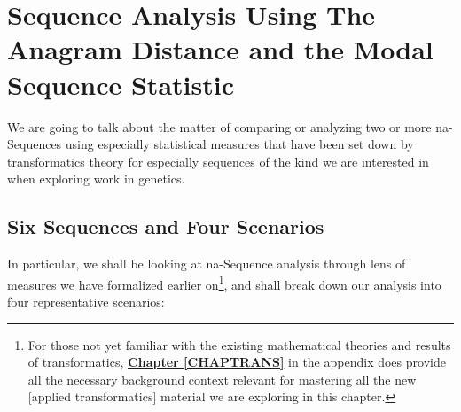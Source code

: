 \documentclass[a4paper, 18pt]{book} %
\begin{document}
\chapter{Sequence Analysis Using The Anagram Distance and the Modal Sequence Statistic}
\label{SEC4A}



We are going to talk about the matter of comparing or analyzing two or more na-Sequences using especially statistical measures that have been set down by transformatics theory for especially sequences of the kind we are interested in when exploring work in genetics. 

\section{Six Sequences and Four Scenarios}
\label{SEC4ASEQ}

In particular, we shall be looking at na-Sequence analysis through lens of measures we have formalized earlier on\footnote{For those not yet familiar with the existing mathematical theories and results of transformatics, \textbf{\hyperref[CHAPTRANS]{Chapter \ref{CHAPTRANS}}} in the appendix does provide all the necessary background context relevant for mastering all the new [applied transformatics] material we are exploring in this chapter.}, and shall break down our analysis into four representative scenarios:
\end{document}
